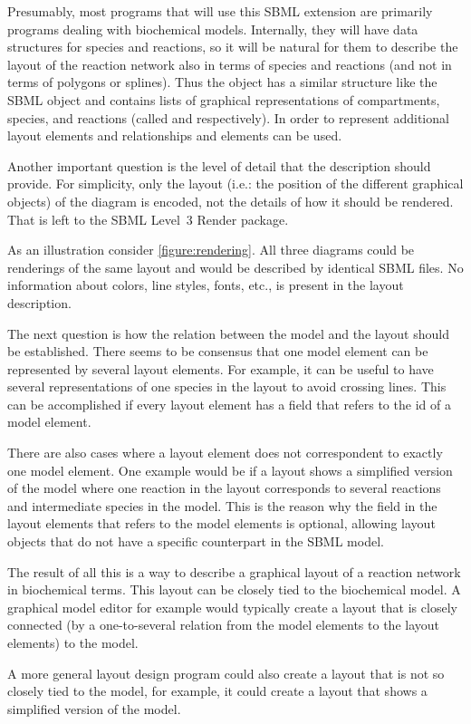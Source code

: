 Presumably, most programs that will use this SBML extension are primarily programs dealing with biochemical models. Internally, they will have data structures for species and reactions, so it will be natural for them to describe the layout of the reaction network also in terms of species and reactions (and not in terms of polygons or splines). Thus the  object has a similar structure like the SBML  object and contains lists of graphical representations of compartments, species, and reactions (called  and  respectively). In order to represent additional layout elements and relationships  and  elements can be used. 

Another important question is the level of detail that the description should provide. For simplicity, only the layout (i.e.: the position of the different graphical objects) of the diagram is encoded, not the details of how it should be rendered. That is left to the SBML Level~3 Render package. 

As an illustration consider \ref{figure:rendering}. All three diagrams could be renderings of the same layout and would be described by identical SBML files. No information about colors, line styles, fonts, etc., is present in the layout description.

The next question is how the relation between the model and the layout should be established. There seems to be consensus that one model element can be represented by several layout elements. For example, it can be useful to have several representations of one species in the layout to avoid crossing lines. This can be accomplished if every layout element has a field that refers to the id of a model element. 

There are also cases where a layout element does not correspondent to exactly one model element. One example would be if a layout shows a simplified version of the model where one reaction in
the layout corresponds to several reactions and intermediate species in the model. This is the reason why the field in the layout elements that refers to the model elements is optional, allowing layout objects that do not have a specific counterpart in the SBML model.

The result of all this is a way to describe a graphical layout of a reaction network in biochemical terms. This layout can be closely tied to the biochemical model. A graphical model editor for example would typically create a layout that is closely connected (by a one-to-several relation from the model elements to the layout elements) to the model. 

A more general layout design program could also create a layout that is not so closely tied to the model, for example, it could create a layout that shows a simplified version of the model.

